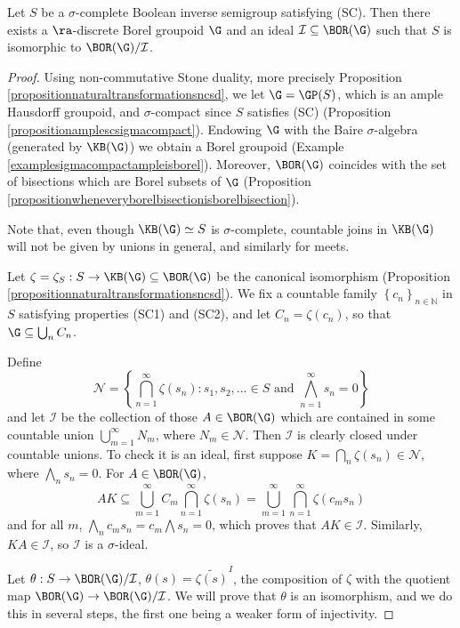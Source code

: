 \begin{theorem}\label{theoremncloomissikorskinontracial}
Let $S$ be a $\sigma$-complete Boolean inverse semigroup satisfying (SC). Then there exists a $\ra$-discrete Borel groupoid $\G$ and an ideal $\mathcal{I}\subseteq\BOR(\G)$ such that $S$ is isomorphic to $\BOR(\G)/\mathcal{I}$.
\end{theorem}
\begin{proof}
Using non-commutative Stone duality, more precisely Proposition \ref{propositionnaturaltransformationsncsd}, we let $\G=\GP(S)$, which is an ample Hausdorff groupoid, and $\sigma$-compact since $S$ satisfies (SC) (Proposition \ref{propositionamplescsigmacompact}). Endowing $\G$ with the Baire $\sigma$-algebra (generated by $\KB(\G)$) we obtain a Borel groupoid (Example \ref{examplesigmacompactampleisborel}). Moreover, $\BOR(\G)$ coincides with the set of bisections which are Borel subsets of $\G$ (Proposition \ref{propositionwheneveryborelbisectionisborelbisection}).

Note that, even though $\KB(\G)\simeq S$ is $\sigma$-complete, countable joins in $\KB(\G)$ will not be given by unions in general, and similarly for meets.

Let $\zeta=\zeta_S:S\to\KB(\G)\subseteq\BOR(\G)$ be the canonical isomorphism (Proposition \ref{propositionnaturaltransformationsncsd}). We fix a countable family $\left\{c_n\right\}_{n\in\mathbb{N}}$ in $S$ satisfying properties (SC1) and (SC2), and let $C_n=\zeta(c_n)$, so that $\G\subseteq\bigcup_n C_n$.

Define
\[\mathcal{N}=\left\{\bigcap_{n=1}^\infty\zeta(s_n):s_1,s_2,\ldots\in S\text{ and }\bigwedge_{n=1}^\infty s_n=0\right\}\]
and let $\mathcal{I}$ be the collection of those $A\in\BOR(\G)$ which are contained in some countable union $\bigcup_{m=1}^\infty N_m$, where $N_m\in\mathcal{N}$. Then $\mathcal{I}$ is clearly closed under countable unions. To check it is an ideal, first suppose $K=\bigcap_n\zeta(s_n)\in\mathcal{N}$, where $\bigwedge_n s_n=0$. For $A\in\BOR(\G)$,
\[AK\subseteq\bigcup_{m=1}^\infty C_m\bigcap_{n=1}^\infty\zeta(s_n)=\bigcup_{m=1}^\infty\bigcap_{n=1}^\infty\zeta(c_m s_n)\]
and for all $m$, $\bigwedge_n c_m s_n=c_m\bigwedge s_n=0$, which proves that $AK\in\mathcal{I}$. Similarly, $KA\in\mathcal{I}$, so $\mathcal{I}$ is a $\sigma$-ideal.

Let $\theta:S\to\BOR(\G)/\mathcal{I}$, $\theta(s)=\widetilde{\zeta(s)}^I$, the composition of $\zeta$ with the quotient map $\BOR(\G)\to\BOR(\G)/\mathcal{I}$. We will prove that $\theta$ is an isomorphism, and we do this in several steps, the first one being a weaker form of injectivity.


\end{proof}
